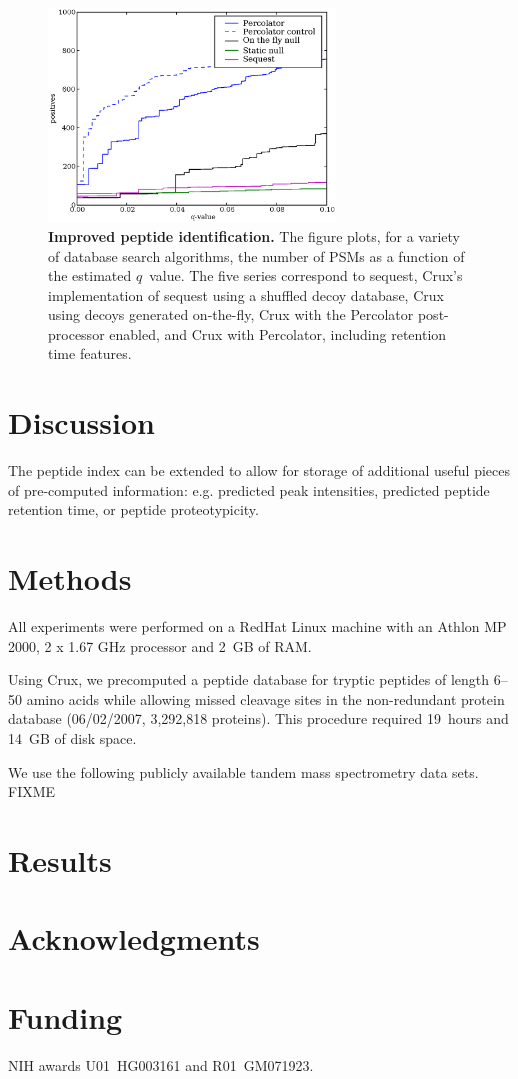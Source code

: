 \documentclass[12pt]{article}
\begin{document}
\begin{figure}
\centering
\includegraphics[width=3in]{./Images/q-value.eps}
\caption{{\bf Improved peptide identification.}  The figure plots, for
  a variety of database search algorithms, the number of PSMs as a
  function of the estimated $q$~value.  The five series correspond to
  {\sc sequest}, Crux's implementation of {\sc sequest} using a shuffled decoy
  database, Crux using decoys generated on-the-fly, Crux with the
  Percolator post-processor enabled, and Crux with Percolator,
  including retention time features.
  \label{figure:pq-plot}}
\end{figure}

\section{Discussion}

The peptide index can be extended to allow for
storage of additional useful pieces of pre-computed information: 
e.g.  predicted peak intensities, predicted peptide retention time,
or peptide proteotypicity.  %


\section{Methods}

All experiments were performed on a RedHat Linux machine with an
Athlon MP 2000, 2 x 1.67 GHz processor and 2~GB of RAM.

Using Crux, we precomputed a peptide database for tryptic peptides of
length 6--50 amino acids while allowing missed cleavage sites in the
non-redundant protein database (06/02/2007, 3,292,818 proteins). This
procedure required 19~hours and 14~GB of disk space.

We use the following publicly available tandem mass spectrometry data
sets.  FIXME

\section{Results}

\section*{Acknowledgments}

\section*{Funding}
NIH awards U01~HG003161 and R01~GM071923.


 
\end{document}
